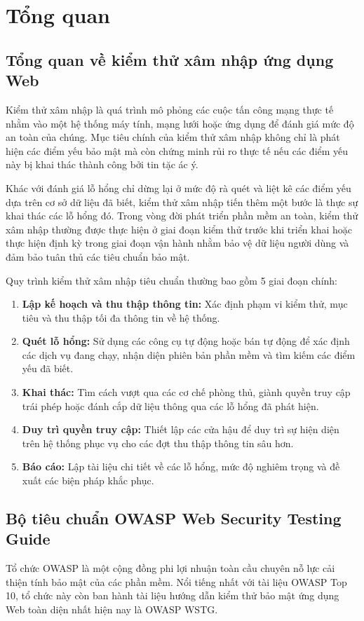 \chapter{Tổng quan}

\section{Tổng quan về kiểm thử xâm nhập ứng dụng Web}
Kiểm thử xâm nhập là quá trình mô phỏng các cuộc tấn công mạng thực tế nhằm vào một hệ thống máy tính, mạng lưới hoặc ứng dụng để đánh giá mức độ an toàn của chúng. Mục tiêu chính của kiểm thử xâm nhập không chỉ là phát hiện các điểm yếu bảo mật mà còn chứng minh rủi ro thực tế nếu các điểm yếu này bị khai thác thành công bởi tin tặc ác ý.

Khác với đánh giá lỗ hổng chỉ dừng lại ở mức độ rà quét và liệt kê các điểm yếu dựa trên cơ sở dữ liệu đã biết, kiểm thử xâm nhập tiến thêm một bước là thực sự khai thác các lỗ hổng đó. Trong vòng đời phát triển phần mềm an toàn, kiểm thử xâm nhập thường được thực hiện ở giai đoạn kiểm thử trước khi triển khai hoặc thực hiện định kỳ trong giai đoạn vận hành nhằm bảo vệ dữ liệu người dùng và đảm bảo tuân thủ các tiêu chuẩn bảo mật.

Quy trình kiểm thử xâm nhập tiêu chuẩn thường bao gồm 5 giai đoạn chính:
\begin{enumerate}
    \item \textbf{Lập kế hoạch và thu thập thông tin:} Xác định phạm vi kiểm thử, mục tiêu và thu thập tối đa thông tin về hệ thống.
    \item \textbf{Quét lỗ hổng:} Sử dụng các công cụ tự động hoặc bán tự động để xác định các dịch vụ đang chạy, nhận diện phiên bản phần mềm và tìm kiếm các điểm yếu đã biết.
    \item \textbf{Khai thác:} Tìm cách vượt qua các cơ chế phòng thủ, giành quyền truy cập trái phép hoặc đánh cắp dữ liệu thông qua các lỗ hổng đã phát hiện.
    \item \textbf{Duy trì quyền truy cập:} Thiết lập các cửa hậu để duy trì sự hiện diện trên hệ thống phục vụ cho các đợt thu thập thông tin sâu hơn.
    \item \textbf{Báo cáo:} Lập tài liệu chi tiết về các lỗ hổng, mức độ nghiêm trọng và đề xuất các biện pháp khắc phục.
\end{enumerate}

\section{Bộ tiêu chuẩn OWASP Web Security Testing Guide}
Tổ chức OWASP là một cộng đồng phi lợi nhuận toàn cầu chuyên nỗ lực cải thiện tính bảo mật của các phần mềm. Nổi tiếng nhất với tài liệu OWASP Top 10, tổ chức này còn ban hành tài liệu hướng dẫn kiểm thử bảo mật ứng dụng Web toàn diện nhất hiện nay là OWASP WSTG.

